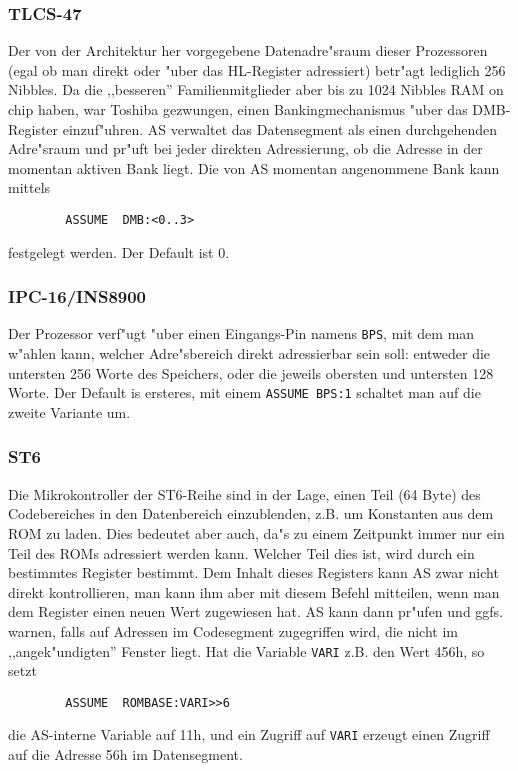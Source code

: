\documentclass[12pt,a4paper,twoside]{report}
\newcommand{\tty}[1]{{\tt #1}}
\begin{document}
\subsubsection{TLCS-47}

Der von der Architektur her vorgegebene Datenadre"sraum dieser
Prozessoren (egal ob man direkt oder "uber das HL-Register adressiert)
betr"agt lediglich 256 Nibbles.  Da die ,,besseren'' Familienmitglieder
aber bis zu 1024 Nibbles RAM on chip haben, war Toshiba gezwungen, einen
Bankingmechanismus "uber das DMB-Register einzuf"uhren.  AS verwaltet
das Datensegment als einen durchgehenden Adre"sraum und pr"uft bei jeder
direkten Adressierung, ob die Adresse in der momentan aktiven Bank
liegt.  Die von AS momentan angenommene Bank kann mittels
\begin{verbatim}
        ASSUME  DMB:<0..3>
\end{verbatim}
festgelegt werden.  Der Default ist 0.


\subsubsection{IPC-16/INS8900}
\label{PACEAssume}

Der Prozessor verf"ugt "uber einen Eingangs-Pin namens {\tt BPS}, mit dem man
w"ahlen kann, welcher Adre"sbereich direkt adressierbar sein soll: entweder
die untersten 256 Worte des Speichers, oder die jeweils obersten und untersten
128 Worte.  Der Default is ersteres, mit einem {\tt ASSUME BPS:1} schaltet man
auf die zweite Variante um.


\subsubsection{ST6}
\label{ST6Assume}

Die Mikrokontroller der ST6-Reihe sind in der Lage, einen Teil (64 Byte)
des Codebereiches in den Datenbereich einzublenden, z.B. um Konstanten aus
dem ROM zu laden.  Dies bedeutet aber auch, da"s zu einem Zeitpunkt immer
nur ein Teil des ROMs adressiert werden kann.  Welcher Teil dies ist, wird
durch ein bestimmtes Register bestimmt.  Dem Inhalt dieses Registers kann
AS zwar nicht direkt kontrollieren, man kann ihm aber mit diesem Befehl
mitteilen, wenn man dem Register einen neuen Wert zugewiesen hat.  AS kann
dann pr"ufen und ggfs. warnen, falls auf Adressen im Codesegment
zugegriffen wird, die nicht im ,,angek"undigten'' Fenster liegt.
Hat die Variable \tty{VARI} z.B. den Wert 456h, so setzt
\begin{verbatim}
        ASSUME  ROMBASE:VARI>>6
\end{verbatim}
die AS-interne Variable auf 11h, und ein Zugriff auf \tty{VARI} erzeugt einen
Zugriff auf die Adresse 56h im Datensegment.
\end{document}

